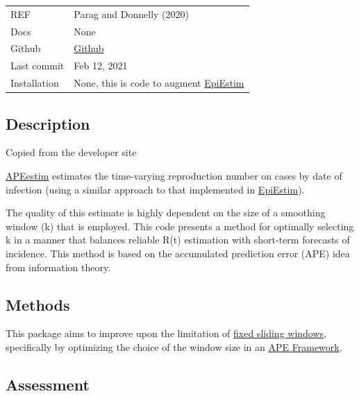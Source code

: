 \documentclass[
  letterpaper,
  DIV=11,
  numbers=noendperiod]{scrreprt}
\begin{document}

\begin{longtable}[]{@{}
  >{\raggedright\arraybackslash}p{}
  >{\raggedright\arraybackslash}p{}@{}}
\toprule\noalign{}
\endhead
\bottomrule\noalign{}
\endlastfoot
REF & Parag and Donnelly (2020) \\
Docs & None \\
Github &
\href{https://github.com/kpzoo/model-selection-for-epidemic-renewal-models}{Github} \\
Last commit & Feb 12, 2021 \\
Installation & None, this is code to augment
\href{package_EpiEstim.qmd}{EpiEstim} \\
\end{longtable}

\subsection*{Description}\label{description}

Copied from the developer site

\href{package_APEestim.qmd}{APEestim} estimates the time-varying
reproduction number on cases by date of infection (using a similar
approach to that implemented in \href{package_EpiEstim.qmd}{EpiEstim}).

The quality of this estimate is highly dependent on the size of a
smoothing window (k) that is employed. This code presents a method for
optimally selecting k in a manner that balances reliable R(t) estimation
with short-term forecasts of incidence. This method is based on the
accumulated prediction error (APE) idea from information theory.

\subsection*{Methods}\label{methods}

This package aims to improve upon the limitation of
\hyperref[sec-fixedwindow]{fixed sliding windows}, specifically by
optimizing the choice of the window size in an \hyperref[sec-ape]{APE
Framework}.

\subsection*{Assessment}\label{assessment}
\end{document}
